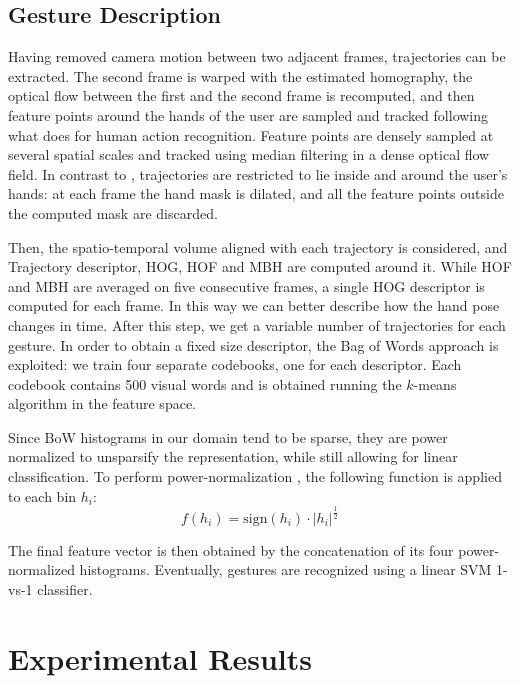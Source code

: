 \subsection{Gesture Description}
Having removed camera motion between two adjacent frames, trajectories can be extracted. The second frame is warped with the estimated homography, the optical flow between the first and the second frame is recomputed, and then feature points around the hands of the user are sampled and tracked following what \cite{wang:2011:inria-00583818:1} does for human action recognition. Feature points are densely sampled at several spatial scales and tracked using median filtering in a dense optical flow field.  In contrast to \cite{wang:2011:inria-00583818:1}, trajectories are restricted to lie inside and around the user's hands: at each frame the hand mask is dilated, and all the feature points outside the computed mask are discarded.

Then, the spatio-temporal volume aligned with each trajectory is considered, and Trajectory descriptor, HOG, HOF and MBH are computed around it. While HOF and MBH are averaged on five consecutive frames, a single HOG descriptor is computed for each frame. In this way we can better describe how the hand pose changes in time. After this step, we get a variable number of trajectories for each gesture. In order to obtain a fixed size descriptor, the Bag of Words approach is exploited: we train four separate codebooks, one for each descriptor. Each codebook contains 500 visual words and is obtained running the $k$-means algorithm in the feature space. 

Since BoW histograms in our domain tend to be sparse, they are power normalized to unsparsify the representation, while still allowing for linear classification. To perform power-normalization \cite{perronnin2010improving}, the following function is applied to each bin $h_i$:
\begin{equation}
f(h_i) = \textrm{sign} (h_i) \cdot |h_i|^{\frac{1}{2}}
\end{equation}

The final feature vector is then obtained by the concatenation of its four power-normalized histograms. Eventually, gestures are recognized using a linear SVM 1-vs-1 classifier.

\section{Experimental Results}

